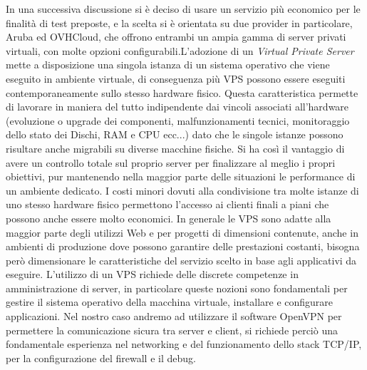 In una successiva discussione si è deciso di usare un servizio più economico per le finalità di test preposte, e la scelta si è orientata su due provider in particolare, Aruba ed OVHCloud, che offrono entrambi un ampia gamma di server privati virtuali, con molte opzioni configurabili.\hfill\break L'adozione di un \textit{Virtual Private Server} mette a disposizione una singola istanza di un sistema operativo che viene eseguito in ambiente virtuale, di conseguenza più VPS possono essere eseguiti contemporaneamente sullo stesso hardware fisico. Questa caratteristica permette di lavorare in maniera del tutto indipendente dai vincoli associati all’hardware (evoluzione o upgrade dei componenti, malfunzionamenti tecnici, monitoraggio dello stato dei Dischi, RAM e CPU ecc...) dato che le singole istanze possono risultare anche migrabili su diverse macchine fisiche. Si ha così il vantaggio di avere un controllo totale sul proprio server per finalizzare al meglio i propri obiettivi, pur mantenendo nella maggior parte delle situazioni le performance di un ambiente dedicato. I costi minori dovuti alla condivisione tra molte istanze di uno stesso hardware fisico permettono l'accesso ai clienti finali a piani che possono anche essere molto economici. In generale le VPS sono adatte alla maggior parte degli utilizzi Web e per progetti di dimensioni contenute, anche in ambienti di produzione dove possono garantire delle prestazioni costanti, bisogna però dimensionare le caratteristiche del servizio scelto in base agli applicativi da eseguire. L’utilizzo di un VPS richiede delle discrete competenze in amministrazione di server, in particolare queste nozioni sono fondamentali per gestire il sistema operativo della macchina virtuale, installare e configurare applicazioni. Nel nostro caso andremo ad utilizzare il software OpenVPN per permettere la comunicazione sicura tra server e client, si richiede perciò una fondamentale esperienza nel networking e del funzionamento dello stack TCP/IP, per la configurazione del firewall e il debug.


